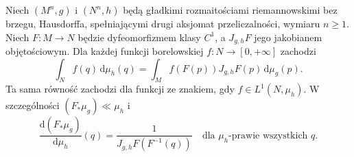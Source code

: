 \begin{twierdzenie}
\label{thm:manifold-change-27}
Niech $(M^n,g)$ i $(N^n,h)$ będą gładkimi rozmaitościami
riemannowskimi bez brzegu, Hausdorffa, spełniającymi drugi
aksjomat przeliczalności, wymiaru $n\ge1$.
Niech $F:M\to N$ będzie dyfeomorfizmem klasy $C^1$,
a $J_{g,h}F$ jego jakobianem objętościowym.
Dla każdej funkcji borelowskiej $f:N\to[0,+\infty]$ zachodzi
\begin{equation}\label{eq:manifold-change-27}
 \int_N f(q)\,\mathrm d\mu_h(q)=
 \int_M f(F(p))J_{g,h}F(p)\,\mathrm d\mu_g(p).
\end{equation}
Ta sama równość zachodzi dla funkcji ze znakiem,
gdy $f\in L^1(N,\mu_h)$.
W szczególności $(F_*\mu_g)\ll\mu_h$ i
\[
 \frac{\mathrm d(F_*\mu_g)}{\mathrm d\mu_h}(q)
 =\frac{1}{J_{g,h}F(F^{-1}(q))}
 \quad\text{dla }\mu_h\text{-prawie wszystkich }q.
\]
\end{twierdzenie}
